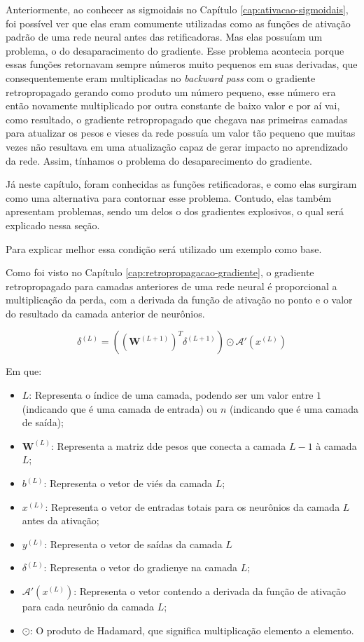 Anteriormente, ao conhecer as sigmoidais no Capítulo \ref{cap:ativacao-sigmoidais}, foi possível ver que elas eram comumente utilizadas como as funções de ativação padrão de uma rede neural antes das retificadoras. Mas elas possuíam um problema, o do desaparacimento do gradiente. Esse problema acontecia porque essas funções retornavam sempre números muito pequenos em suas derivadas, que consequentemente eram multiplicadas no \textit{backward pass} com o gradiente retropropagado gerando como produto um número pequeno, esse número era então novamente multiplicado por outra constante de baixo valor e por aí vai, como resultado, o gradiente retropropagado que chegava nas primeiras camadas para atualizar os pesos e vieses da rede possuía um valor tão pequeno que muitas vezes não resultava em uma atualização capaz de gerar impacto no aprendizado da rede. Assim, tínhamos o problema do desaparecimento do gradiente.

Já neste capítulo, foram conhecidas as funções retificadoras, e como elas surgiram como uma alternativa para contornar esse problema. Contudo, elas também apresentam problemas, sendo um delos o dos gradientes explosivos, o qual será explicado nessa seção.

Para explicar melhor essa condição será utilizado um exemplo como base.

Como foi visto no Capítulo \ref{cap:retropropagacao-gradiente}, o gradiente retropropagado para camadas anteriores de uma rede neural é proporcional a multiplicação da perda, com a derivada da função de ativação no ponto e o valor do resultado da camada anterior de neurônios. 

\[
    \delta^{(L)} = \left( \left( \textbf{W}^{(L+1)} \right)^T \delta^{(L+1)} \right)  \odot \mathcal{A}'(x^{(L)})
\]

Em que: 

\begin{itemize}
    \item $L$: Representa o índice de uma camada, podendo ser um valor entre $1$ (indicando que é uma camada de entrada) ou $n$ (indicando que é uma camada de saída);
    \item $\textbf{W}^{(L)}$: Representa a matriz dde pesos que conecta a camada $L - 1$ à camada $L$;
    \item $b^{(L)}$: Representa o vetor de viés da camada $L$;
    \item $x^{(L)}$: Representa o vetor de entradas totais para os neurônios da camada $L$ antes da ativação;
    \item $y^{(L)}$: Representa o vetor de saídas da camada $L$
    \item $\delta^{(L)}$: Representa o vetor do gradienye na camada $L$;
    \item $\mathcal{A}'(x^{(L)})$: Representa o vetor contendo a derivada da função de ativação para cada neurônio da camada $L$;
    \item $\odot$: O produto de Hadamard, que significa multiplicação elemento a elemento.
\end{itemize}

